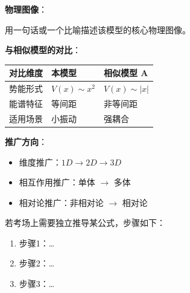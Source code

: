 \begin{insightbox}[物理图像与模型关联]
\textbf{物理图像}：

用一句话或一个比喻描述该模型的核心物理图像。

\textbf{与相似模型的对比}：
\begin{center}
\begin{tabular}{lll}
\toprule
\textbf{对比维度} & \textbf{本模型} & \textbf{相似模型 A} \\
\midrule
势能形式 & $V(x)\sim x^2$ & $V(x)\sim |x|$ \\
能谱特征 & 等间距 & 非等间距 \\
适用场景 & 小振动 & 强耦合 \\
\bottomrule
\end{tabular}
\end{center}

\textbf{推广方向}：
\begin{itemize}[nosep]
    \item 维度推广：$1D \to 2D \to 3D$
    \item 相互作用推广：单体 $\to$ 多体
    \item 相对论推广：非相对论 $\to$ 相对论
\end{itemize}
\end{insightbox}

\begin{derivationbox}
若考场上需要独立推导某公式，步骤如下：
\begin{enumerate}
    \item 步骤1：\dots
    \item 步骤2：\dots
    \item 步骤3：\dots
\end{enumerate}
\end{derivationbox}

\vspace{1em}
